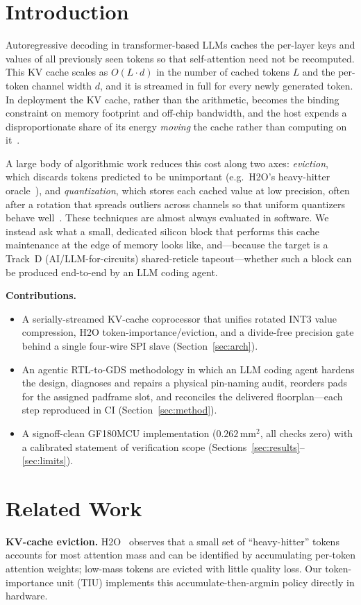 \documentclass[conference]{IEEEtran}
\begin{document}
\section{Introduction}
Autoregressive decoding in transformer-based LLMs caches the per-layer keys and
values of all previously seen tokens so that self-attention need not be
recomputed. This KV cache scales as $O(L\cdot d)$ in the number of cached tokens
$L$ and the per-token channel width $d$, and it is streamed in full for every
newly generated token. In deployment the KV cache, rather than the arithmetic,
becomes the binding constraint on memory footprint and off-chip bandwidth, and
the host expends a disproportionate share of its energy \emph{moving} the cache
rather than computing on it~\cite{h2o,kvquant}.

A large body of algorithmic work reduces this cost along two axes:
\emph{eviction}, which discards tokens predicted to be unimportant
(e.g.\ H2O's heavy-hitter oracle~\cite{h2o}), and \emph{quantization}, which
stores each cached value at low precision, often after a rotation that spreads
outliers across channels so that uniform quantizers behave
well~\cite{quarot,kvquant,kivi}. These techniques are almost always evaluated in
software. We instead ask what a small, dedicated silicon block that performs
this cache maintenance at the edge of memory looks like, and---because the
target is a Track~D (AI/LLM-for-circuits) shared-reticle tapeout---whether such a
block can be produced end-to-end by an LLM coding agent.

\noindent\textbf{Contributions.}
\begin{itemize}
\item A serially-streamed KV-cache coprocessor that unifies rotated INT3 value
compression, H2O token-importance/eviction, and a divide-free precision gate
behind a single four-wire SPI slave (Section~\ref{sec:arch}).
\item An agentic RTL-to-GDS methodology in which an LLM coding agent hardens the
design, diagnoses and repairs a physical pin-naming audit, reorders pads for the
assigned padframe slot, and reconciles the delivered floorplan---each step
reproduced in CI (Section~\ref{sec:method}).
\item A signoff-clean GF180MCU implementation ($0.262\,\text{mm}^2$, all checks
zero) with a calibrated statement of verification scope
(Sections~\ref{sec:results}--\ref{sec:limits}).
\end{itemize}

\section{Related Work}
\textbf{KV-cache eviction.} H2O~\cite{h2o} observes that a small set of
``heavy-hitter'' tokens accounts for most attention mass and can be identified by
accumulating per-token attention weights; low-mass tokens are evicted with little
quality loss. Our token-importance unit (TIU) implements this accumulate-then-argmin
policy directly in hardware.
\end{document}
